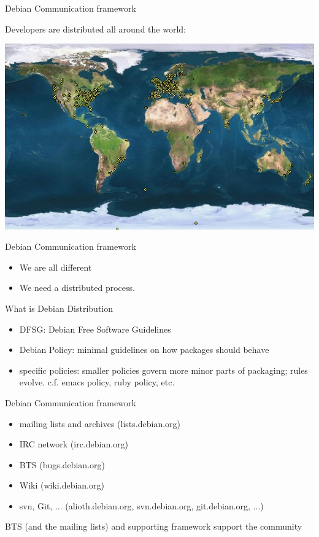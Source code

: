 \documentclass[cjk,dvipdfmx,12pt]{beamer}
\begin{document}
\begin{frame}{Debian Communication framework }

Developers are distributed all around the world:

 \includegraphics[width=1\hsize]{image200805/developers-map.jpeg} 

\end{frame}

\begin{frame}{Debian Communication framework }

\begin{itemize}
 \item  We are all different

 \item  We need a distributed process.
\end{itemize}

\end{frame}

\begin{frame}{What is Debian Distribution}
\begin{itemize}
 \item DFSG: Debian Free Software Guidelines
 \item Debian Policy: minimal guidelines on how packages should behave
 \item specific policies: smaller policies govern more minor parts of
       packaging; rules evolve. c.f. emacs policy, ruby policy, etc.
\end{itemize}
\end{frame}

\begin{frame}{Debian Communication framework}
 \begin{itemize}
  \item mailing lists and archives (lists.debian.org)
  \item IRC network (irc.debian.org)
  \item BTS (bugs.debian.org)
  \item Wiki (wiki.debian.org)
  \item svn, Git, ... (alioth.debian.org, svn.debian.org,
	git.debian.org, ...)
 \end{itemize}

BTS (and the mailing lists) and supporting framework support the community

\end{frame}
\end{document}
